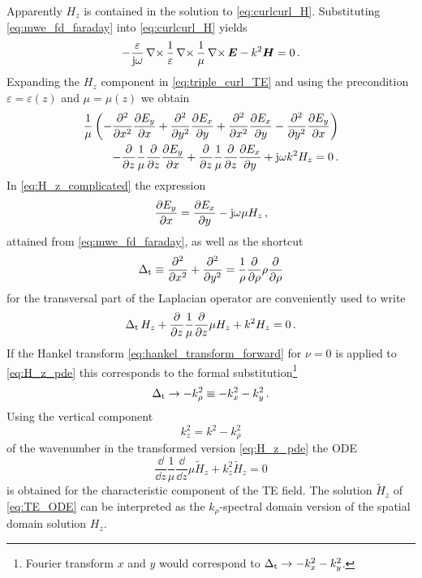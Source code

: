 Apparently $H_z$ is contained in the solution to \eqref{eq:curlcurl_H}. Substituting \eqref{eq:mwe_fd_faraday} into \eqref{eq:curlcurl_H} yields
\begin{equation}\label{eq:triple_curl_TE}
	- \frac{\varepsilon}{\im \omega}\curl\frac{1}{\varepsilon}\curl\frac{1}{\mu} \curl \pvec{E} - k^2\pvec{H} = 0 \,.
\end{equation}
Expanding the $H_z$ component in \eqref{eq:triple_curl_TE} and using the precondition $\varepsilon = \varepsilon\left(z\right)$ and $\mu = \mu\left(z\right)$ we obtain
\begin{equation}\label{eq:H_z_complicated}
	\begin{split}
		\frac{1}{\mu} \left(-\pdsec{x} \pd[E_y]{x} + \pdsec{y} \pd[E_x]{y} + \pdsec{x} \pd[E_x]{y} - \pdsec{y} \pd[E_y]{x}\right) \\ -\pd{z}\frac{1}{\mu}\pd{z}\pd[E_y]{x} + \pd{z}\frac{1}{\mu}\pd{z}\pd[E_x]{y} + \im \omega k^2 H_z = 0 \,.
	\end{split}
\end{equation}
In \eqref{eq:H_z_complicated} the expression
\begin{equation}
	\pd[E_y]{x} = \pd[E_x]{y} - \im \omega \mu H_z \,,
\end{equation}
attained from \eqref{eq:mwe_fd_faraday}, as well as the shortcut
\begin{equation}\label{eq:laplace_transversal}
	\laplaceTrans \equiv \frac{\partial^2}{\partial x^2} + \frac{\partial^2}{\partial y^2} = \frac{1}{\rho}\frac{\partial}{\partial \rho} \rho \frac{\partial}{\partial \rho}
\end{equation}
for the transversal part of the Laplacian operator \cite[p.~731]{Bronstein2016} are conveniently used to write
\begin{equation}\label{eq:H_z_pde}
	\laplaceTrans H_z + \frac{\partial}{\partial z}\frac{1}{\mu}\frac{\partial}{\partial z} \mu H_z + k^2 H_z = 0 \,.
\end{equation}
If the Hankel transform \eqref{eq:hankel_transform_forward} for $\nu = 0$ is applied to \eqref{eq:H_z_pde} this corresponds to the formal substitution\footnote{Fourier transform \wrt $x$ and $y$ would correspond to $\laplaceTrans \rightarrow - k_x^2 - k_y^2$.} \cite{Michalski2016b}
\begin{equation}
	\laplaceTrans \rightarrow -k_\rho^2 \equiv - k_x^2 - k_y^2 \,.
\end{equation}
Using the vertical component
\begin{equation}\label{eq:k_z_square}
	k_z^2 = k^2 - k_\rho^2
\end{equation}
of the wavenumber in the transformed version \eqref{eq:H_z_pde} the \ac{ODE}
\begin{equation}\label{eq:TE_ODE}
	\frac{\dd}{\dd z}\frac{1}{\mu}\frac{\dd}{\dd z}\mu  \tilde{H}_z + k_z^2 \tilde{H}_z = 0
\end{equation}
is obtained for the characteristic component of the \ac{TE} field. The solution $\tilde{H}_z$ of \eqref{eq:TE_ODE} can be interpreted as the $k_\rho$-spectral domain version of the spatial domain solution $H_z$.

